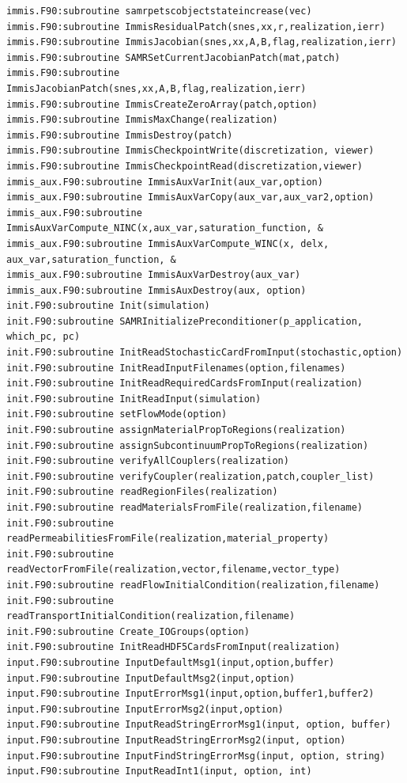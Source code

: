 \documentclass[12pt]{article}
\begin{document}
\begin{verbatim}
immis.F90:subroutine samrpetscobjectstateincrease(vec)
immis.F90:subroutine ImmisResidualPatch(snes,xx,r,realization,ierr)
immis.F90:subroutine ImmisJacobian(snes,xx,A,B,flag,realization,ierr)
immis.F90:subroutine SAMRSetCurrentJacobianPatch(mat,patch) 
immis.F90:subroutine ImmisJacobianPatch(snes,xx,A,B,flag,realization,ierr)
immis.F90:subroutine ImmisCreateZeroArray(patch,option)
immis.F90:subroutine ImmisMaxChange(realization)
immis.F90:subroutine ImmisDestroy(patch)
immis.F90:subroutine ImmisCheckpointWrite(discretization, viewer)
immis.F90:subroutine ImmisCheckpointRead(discretization,viewer)
immis_aux.F90:subroutine ImmisAuxVarInit(aux_var,option)
immis_aux.F90:subroutine ImmisAuxVarCopy(aux_var,aux_var2,option)
immis_aux.F90:subroutine ImmisAuxVarCompute_NINC(x,aux_var,saturation_function, &
immis_aux.F90:subroutine ImmisAuxVarCompute_WINC(x, delx, aux_var,saturation_function, &
immis_aux.F90:subroutine ImmisAuxVarDestroy(aux_var)
immis_aux.F90:subroutine ImmisAuxDestroy(aux, option)
init.F90:subroutine Init(simulation)
init.F90:subroutine SAMRInitializePreconditioner(p_application, which_pc, pc)
init.F90:subroutine InitReadStochasticCardFromInput(stochastic,option)
init.F90:subroutine InitReadInputFilenames(option,filenames)
init.F90:subroutine InitReadRequiredCardsFromInput(realization)
init.F90:subroutine InitReadInput(simulation)
init.F90:subroutine setFlowMode(option)
init.F90:subroutine assignMaterialPropToRegions(realization)
init.F90:subroutine assignSubcontinuumPropToRegions(realization)
init.F90:subroutine verifyAllCouplers(realization)
init.F90:subroutine verifyCoupler(realization,patch,coupler_list)
init.F90:subroutine readRegionFiles(realization)
init.F90:subroutine readMaterialsFromFile(realization,filename)
init.F90:subroutine readPermeabilitiesFromFile(realization,material_property)
init.F90:subroutine readVectorFromFile(realization,vector,filename,vector_type)
init.F90:subroutine readFlowInitialCondition(realization,filename)
init.F90:subroutine readTransportInitialCondition(realization,filename)
init.F90:subroutine Create_IOGroups(option)
init.F90:subroutine InitReadHDF5CardsFromInput(realization)
input.F90:subroutine InputDefaultMsg1(input,option,buffer)
input.F90:subroutine InputDefaultMsg2(input,option)
input.F90:subroutine InputErrorMsg1(input,option,buffer1,buffer2)
input.F90:subroutine InputErrorMsg2(input,option)
input.F90:subroutine InputReadStringErrorMsg1(input, option, buffer)
input.F90:subroutine InputReadStringErrorMsg2(input, option)
input.F90:subroutine InputFindStringErrorMsg(input, option, string)
input.F90:subroutine InputReadInt1(input, option, int)

\end{verbatim}
\end{document}
